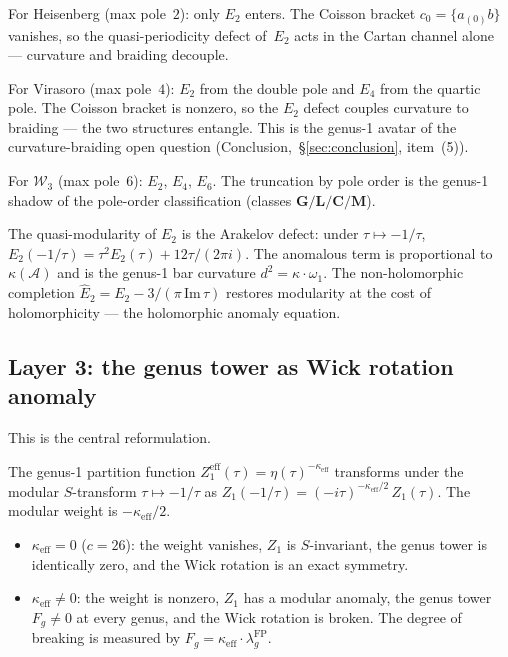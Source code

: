 \documentclass[11pt]{article}
\newcommand{\cA}{\mathcal{A}}
\newcommand{\cW}{\mathcal{W}}
\begin{document}
For Heisenberg (max pole~$2$): only $E_2$ enters.  The
Coisson bracket $c_0 = \{a_{(0)}b\}$ vanishes, so the
quasi-periodicity defect of~$E_2$ acts in the Cartan channel
alone --- curvature and braiding decouple.

For Virasoro (max pole~$4$): $E_2$ from the double pole and
$E_4$ from the quartic pole.  The Coisson bracket is nonzero,
so the $E_2$ defect couples curvature to braiding --- the
two structures entangle.  This is the genus-1 avatar of
the curvature-braiding open question
(Conclusion,~\S\ref{sec:conclusion}, item~(5)).

For $\cW_3$ (max pole~$6$): $E_2$, $E_4$, $E_6$.
The truncation by pole order is the genus-1 shadow of the
pole-order classification (classes $\mathbf{G}/\mathbf{L}/\mathbf{C}/\mathbf{M}$).

The quasi-modularity of $E_2$ is the Arakelov defect: under
$\tau \mapsto -1/\tau$, $E_2(-1/\tau) = \tau^2 E_2(\tau) + 12\tau/(2\pi i)$.
The anomalous term is proportional to $\kappa(\cA)$ and is
the genus-1 bar curvature $d^2 = \kappa \cdot \omega_1$.  The
non-holomorphic completion $\hat{E}_2 = E_2 - 3/(\pi\,\mathrm{Im}\,\tau)$
restores modularity at the cost of holomorphicity --- the
holomorphic anomaly equation.

\subsection{Layer 3: the genus tower as Wick rotation anomaly}

This is the central reformulation.

The genus-1 partition function
$Z_1^{\mathrm{eff}}(\tau) = \eta(\tau)^{-\kappa_{\mathrm{eff}}}$
transforms under the modular $S$-transform $\tau \mapsto -1/\tau$
as $Z_1(-1/\tau) = (-i\tau)^{-\kappa_{\mathrm{eff}}/2}\,Z_1(\tau)$.
The modular weight is $-\kappa_{\mathrm{eff}}/2$.

\begin{itemize}
\item $\kappa_{\mathrm{eff}} = 0$ ($c = 26$):
  the weight vanishes, $Z_1$ is $S$-invariant, the genus tower
  is identically zero, and the Wick rotation is an exact symmetry.
\item $\kappa_{\mathrm{eff}} \ne 0$:
  the weight is nonzero, $Z_1$ has a modular anomaly,
  the genus tower $F_g \ne 0$ at every genus, and the Wick
  rotation is broken.  The degree of breaking is measured by
  $F_g = \kappa_{\mathrm{eff}} \cdot \lambda_g^{\mathrm{FP}}$.
\end{itemize}
\end{document}
